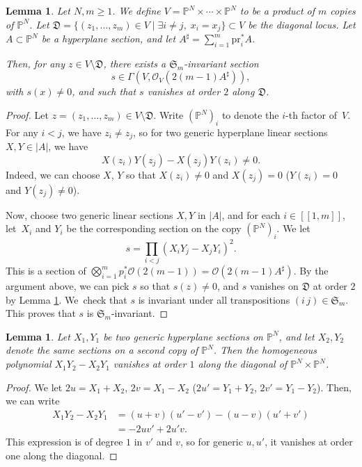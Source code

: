 \documentclass[JEP,XML,SOM,Unicode, NoEqCountersInSection,NoFloatCountersInSection,published]{cedram}
\let\mathcal\mathscr
\newcommand{\llbracket}{[\![}
\newcommand{\rrbracket}{]\!]}
\newcommand{\pr}{\mathrm{pr}}
\theoremstyle{theorem}
\newtheorem{lemma}[proposition]{Lemma}
\theoremstyle{definition}
\def\bP{{\mathbb P}}
\begin{document}
\begin{lemma} \label{lemsect}
Let $N, m \geq 1$. We define $V = \mathbb P^N \times \cdots \times \mathbb P^N$ to be a product of $m$ copies of $\mathbb P^N$. Let $\mathfrak{D} = \{ (z_1,\dots, z_m) \in V \mid \exists i \neq j,\; x_i = x_j\} \subset V$ be the diagonal locus. Let $A \subset \bP^N$ be a hyperplane section, and let $A^\sharp = \sum_{i=1}^m \pr_i^{\ast} A$.

Then, for any $z \in V \setminus \mathfrak{D}$, there exists a $\mathfrak{S}_m$-invariant section
\[
s \in \Gamma(V, \mathcal O_V( 2(m-1) A^\sharp)),
\]
with $s(x) \neq 0$, and such that $s$ vanishes at order $2$ along $\mathfrak{D}$.
\end{lemma}
\begin{proof}
Let $z = (z_1,\dots, z_m) \in V \setminus \mathfrak D$. Write $(\mathbb P^N)_i$ to denote the $i$-th factor of~$V$. For any $i < j$, we have $z_i \neq z_j$, so for two generic hyperplane linear sections $X, Y \in |A|$, we have
\begin{equation} \label{eqnonzero}
X (z_i) Y (z_j) - X (z_j) Y (z_i) \neq 0.
\end{equation}
Indeed, we can choose $X$, $Y$ so that $X(z_i) \neq 0$ and $X(z_j) = 0$ (\resp $Y(z_i) = 0$ and $Y(z_j) \neq 0$).

Now, choose two generic linear sections \(X, Y\) in \(|A|\), and for each $i\in\llbracket1,m\rrbracket$, let~$X_i$ and $Y_i$ be the corresponding section on the copy $(\mathbb P^N)_i$. We let
\[
s = \prod_{i < j} \left( X_i Y_j - X_j Y_i \right)^2.
\]
This is a section of $\bigotimes_{i = 1}^m p_i^\ast \mathcal O(2(m-1)) = \mathcal O(2(m-1)A^\sharp)$. By the argument above, we can pick \(s\) so that $s(z) \neq 0$, and $s$ vanishes on $\mathfrak{D}$ at order $2$ by Lemma \ref{lemcomputorder}. We~check that $s$ is invariant under all transpositions $(i \,j) \in \mathfrak{S}_m$. This proves that $s$ is $\mathfrak{S}_m$-invariant.
\end{proof}

\begin{lemma} \label{lemcomputorder}
Let $X_1, Y_1$ be two generic hyperplane sections on $\mathbb P^N$, and let \(X_{2}, Y_{2}\) denote the same sections on a second copy of \(\bP^{N}\). Then the homogeneous polynomial $X_1 Y_2 - X_2 Y_1$ vanishes at order $1$ along the diagonal of $\mathbb P^N \times \mathbb P^N$.
\end{lemma}
\begin{proof}
We let $2 u = X_1 + X_2$, $2 v = X_1 - X_2$ (\resp $2 u' = Y_1 + Y_2$, $2 v' = Y_1 - Y_2$). Then, we can write
\begin{align*}
X_1 Y_2 - X_2 Y_1 & = (u + v)(u' - v') - (u - v)(u' + v') \\
& = - 2 u v' + 2 u' v.
\end{align*}
This expression is of degree $1$ in $v'$ and $v$, so for generic $u, u'$, it vanishes at order one along the diagonal.
\end{proof}
\end{document}
